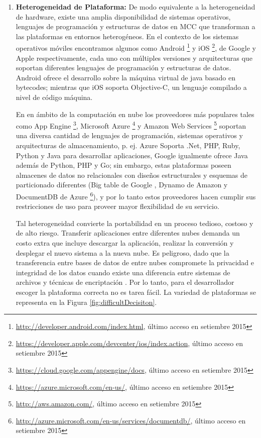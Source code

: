\begin{enumerate}
\begin{itemize}
 \end{itemize}

 \item \textbf{Heterogeneidad de Plataforma:} De modo equivalente a la heterogeneidad de hardware, existe una amplia disponibilidad de sistemas
 operativos, lenguajes de programación y estructuras de datos en MCC que transforman a las plataformas en entornos heterogéneos. En el contexto
 de los sistemas operativos móviles encontramos algunos como Android \footnote{\url{http://developer.android.com/index.html}, último acceso en setiembre 2015} y iOS 
 \footnote{\url{https://developer.apple.com/devcenter/ios/index.action}, último acceso en setiembre 2015}, de Google y Apple respectivamente,
 cada uno con múltiples versiones
 y  arquitecturas que soportan diferentes lenguajes de programación y estructuras de datos. Android ofrece el desarrollo sobre la máquina virtual 
 de java basado en bytecodes; mientras que iOS soporta Objective-C, un lenguaje compilado a nivel de código máquina.
 
 En en ámbito de la computación en nube los proveedores más populares tales como App Engine
 \footnote{\url{https://cloud.google.com/appengine/docs}, último acceso en setiembre 2015}, Microsoft Azure
 \footnote{\url{https://azure.microsoft.com/en-us/}, último acceso en setiembre 2015} y 
 Amazon Web Services \footnote{\url{http://aws.amazon.com/}, último acceso en setiembre 2015} soportan una diversa cantidad de lenguajes de programación, sistemas operativos
 y arquitecturas de almacenamiento, p. ej. Azure Soporta .Net, PHP, Ruby, Python y Java para desarrollar aplicaciones, Google 
 igualmente ofrece Java además de Python, PHP y Go; sin embargo, estas plataformas poseen almacenes de datos no relacionales con diseños 
 estructurales y esquemas de particionado diferentes (Big table de Google \cite{Chang:2006:BDS:1267308.1267323}, Dynamo de Amazon \cite{decandia2007dynamo} y 
 DocumentDB de Azure 
 \footnote{\url{http://azure.microsoft.com/en-us/services/documentdb/}, último acceso en setiembre 2015}), y por lo tanto estos proveedores hacen cumplir  sus restricciones
 de uso  para proveer mayor flexibilidad de su servicio.
 
 Tal heterogeneidad convierte la portabilidad en un proceso tedioso, costoso y de alto riesgo. Transferir aplicaciones entre diferentes
 nubes demanda un costo extra que incluye descargar la aplicación, realizar la conversión y desplegar el nuevo sistema a la nueva nube. Es
 peligroso, dado que la transferencia entre bases de datos de entre nubes compromete la privacidad e integridad de los datos cuando existe una
 diferencia entre sistemas de archivos y técnicas de encriptación \cite{5708456}. Por lo tanto, para el desarrollador escoger la plataforma 
 correcta no es tarea fácil. La variedad de plataformas se representa en la Figura \ref{fig:difficultDecisiton}.
 

\end{enumerate}
